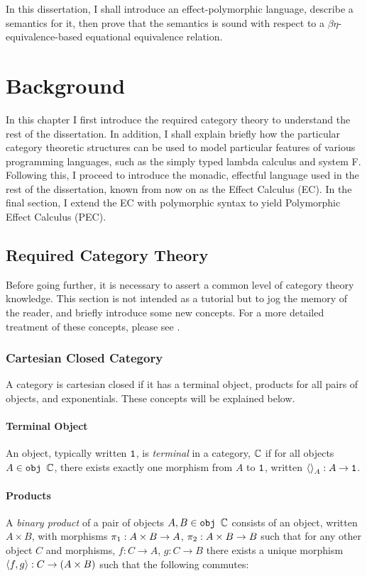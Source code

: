 \documentclass{Report}
\begin{document}
In this dissertation, I shall introduce an effect-polymorphic language, describe a semantics for it, then prove that the semantics is sound with respect to a $\beta\eta$-equivalence-based equational equivalence relation.

\chapter{Background}



In this chapter I first introduce the required category theory to understand the rest of the dissertation. In addition, I shall explain briefly how the particular category theoretic structures can be used to model particular features of various programming languages, such as the simply typed lambda calculus and system F. Following this, I proceed to introduce the monadic, effectful language used in the rest of the dissertation, known from now on as the Effect Calculus (EC). In the final section, I extend the EC with polymorphic syntax to yield Polymorphic Effect Calculus (PEC).

\section{Required Category Theory}\label{CategoryTheoryRequirements}


Before going further, it is necessary to assert a common level of category theory knowledge. This section is not intended as a tutorial but to jog the memory of the reader, and briefly introduce some new concepts. For a more detailed treatment of these concepts, please see \cite{maclane:71}.

\subsection{Cartesian Closed Category}\label{CCC}
A category is cartesian closed if it has a terminal object, products for all pairs of objects, and exponentials. These concepts will be explained below.

\subsubsection{Terminal Object}
An object, typically written $\texttt{1}$, is \textit{terminal} in a category, $\mathbb{C}$ if for all objects $A\in\texttt{obj }\mathbb{C}$, there exists exactly one morphism from $A$ to $\texttt{1}$, written $\left\langle\right\rangle_{A}: A \rightarrow \texttt{1}$.

\subsubsection{Products}
A \textit{binary product} of a pair of objects $A, B\in\texttt{obj }\mathbb{C}$ consists of an object, written $A \times B$, with morphisms $\pi_1: A\times B\rightarrow A$, $\pi_2: A\times B \rightarrow B$ such that for any other object $C$ and morphisms, $f: C\rightarrow A$, $g: C\rightarrow B$ there exists a unique morphism $\left\langle f, g\right\rangle: C \rightarrow (A\times B)$ such that the following commutes:
\end{document}
